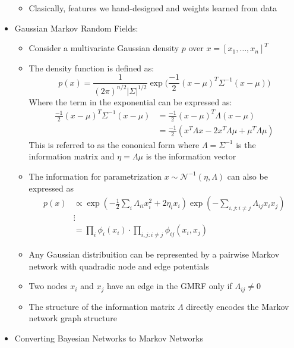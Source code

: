 \documentclass{article}
\begin{document}
\begin{itemize}
\begin{itemize}
        \item Clasically, features we hand-designed and weights learned from data 
    \end{itemize}
    \item Gaussian Markov Random Fields: \begin{itemize}
        \item Consider a multivariate Gaussian density $p$ over $x = [x_1, \dots , x_n]^T$
        \item The density function is defined as: \begin{equation*}
            p(x) = \frac{1}{(2\pi)^{n/2}|\Sigma|^{1/2}}\exp \bigg(\frac{-1}{2}(x - \mu)^T \Sigma^{-1}(x - \mu)\bigg)
        \end{equation*}
        Where the term in the exponential can be expressed as: \begin{align*}
            \frac{-1}{2}(x - \mu)^T \Sigma^{-1}(x - \mu) &= \frac{-1}{2}(x - \mu)^T \Lambda (x - \mu)\\
            &= \frac{-1}{2}(x^T \Lambda x - 2x^T \Lambda \mu + \mu^T \Lambda \mu)
        \end{align*}
        This is referred to as the cononical form where $\Lambda = \Sigma^{-1}$ is the information matrix and $\eta = \Lambda\mu$ is the information vector 
        \item The information for parametrization $x \sim \mathcal{N}^{-1}(\eta, \Lambda)$ can also be expressed as \begin{align*}
            p(x) &\propto \exp (-\frac{1}{2}\sum_{i}\Lambda_{ii}x_i^2 + 2\eta_i x_i) \exp(-\sum_{i, j : i \neq j }\Lambda_{ij}x_ix_j) \\
            &\vdots \\
            &= \prod_i \phi_i(x_i) \cdot \prod_{i,j:i\neq j} \phi_{ij}(x_i, x_j)
        \end{align*}
        \item Any Gaussian distribuition can be represented by a pairwise Markov network with quadradic node and edge potentials 
        \item Two nodes $x_i$ and $x_j$ have an edge in the GMRF only if $\Lambda_{ij} \neq 0$
        \item The structure of the information matrix $\Lambda$ directly encodes the Markov network graph structure 
    \end{itemize}
    \item Converting Bayesian Networks to Markov Networks \begin{itemize}

\end{itemize}
\end{itemize}
\end{document}
